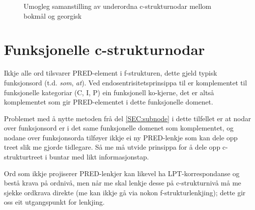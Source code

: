 \documentclass[11pt,a4paper,oneside,draft]{book}
\begin{document}
\begin{figure}[htp]
\centering
{}


\caption{Umogleg samanstilling av underordna c-strukturnodar mellom bokmål og georgisk}
 \label{fig:ikkjesub}
\end{figure}

\section{Funksjonelle c-strukturnodar}
\label{sec-3.10}

\label{SEC:fnord}

Ikkje alle ord tilsvarer PRED-element i f-strukturen, dette gjeld
typisk funksjonsord (t.d. \emph{som}, \emph{at}). Ved endosentrisitetsprinsippa
til \citet{bresnan2001lfs} er komplementet til funksjonelle kategoriar
(C, I, P) ein funksjonell ko-kjerne, det er altså komplementet som gir
PRED-elementet i dette funksjonelle domenet.

Problemet med å nytte metoden frå del \ref{SEC:subnode} i dette
tilfellet er at nodar over funksjonsord er i det same funksjonelle
domenet som komplementet, og nodane over funksjonsorda tilføyer ikkje
ei ny PRED-lenkje som kan dele opp treet slik me gjorde tidlegare. Så
me må utvide prinsippa for å dele opp c-strukturtreet i buntar med
likt informasjonstap.

Ord som ikkje projiserer PRED-lenkjer kan likevel ha
LPT-korrespondanse og bestå krava på ordnivå, men når me skal lenkje
desse på c-strukturnivå må me sjekke ordkrava direkte (me kan ikkje gå
via nokon f-strukturlenkjing); dette gir oss eit utgangspunkt for
lenkjing.
\end{document}
